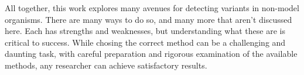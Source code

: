 All together, this work explores many avenues for detecting variants in non-model organisms. 
There are many ways to do so, and many more that aren't discussed here.
Each has strengths and weaknesses, but understanding what these are is critical to success.
While chosing the correct method can be a challenging and daunting task, with careful preparation and rigorous examination of the available methods, any researcher can achieve satisfactory results.

\printbibliography{}

